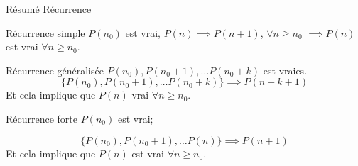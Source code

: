 \begin{parag}{Résumé Récurrence}
    \begin{subparag}{Récurrence simple}
        $P\left(n_0\right)$ est vrai, $P\left(n\right) \implies P\left(n+1\right)$, $\forall n \geq n_0$ $ \implies P\left(n\right)$ est vrai $\forall n \geq n_0$.
    \end{subparag}
    \begin{subparag}{Récurrence généralisée}
        $P\left(n_0\right), P\left(n_0 + 1\right), \ldots P\left(n_0 + k\right)$ est vraies.\\
        \begin{equation*} \{ P\left(n_0\right), P\left(n_0 + 1\right), \ldots P\left(n_0 + k\right)\} \implies P\left(n+k+1\right)\end{equation*}
        Et cela implique que $P\left(n\right)$ vrai $\forall n \geq n_0$.
    \end{subparag}
    \begin{subparag}{Récurrence forte}
        $P\left(n_0\right)$ est vrai; 
        
        \begin{equation*} \{ P\left(n_0\right), P\left(n_0 + 1\right), \ldots P\left(n\right)\} \implies P\left(n+1\right)\end{equation*}
        Et cela implique que $P\left(n\right)$ est vrai $\forall n \geq n_0$.
        
    \end{subparag}
    
\end{parag}


